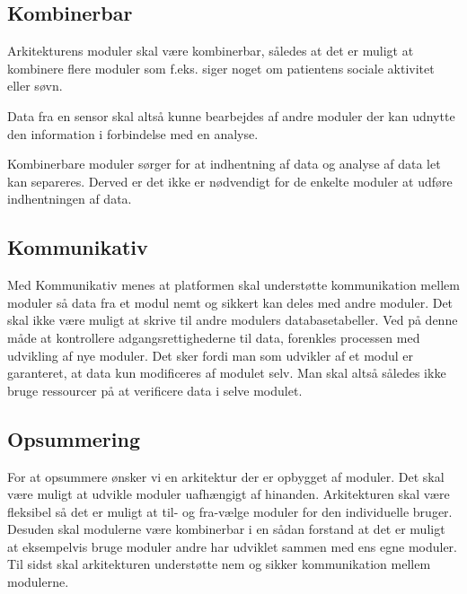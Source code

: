 \subsection{Kombinerbar}\label{arkitekturkrav::kombinerbar}
Arkitekturens moduler skal være kombinerbar, således at det er muligt at kombinere flere moduler som f.eks. siger noget om patientens sociale aktivitet eller søvn.

Data fra en sensor skal altså kunne bearbejdes af andre moduler der kan udnytte den information i forbindelse med en analyse.

Kombinerbare moduler sørger for at indhentning af data og analyse af data let kan separeres.
Derved er det ikke er nødvendigt for de enkelte moduler at udføre indhentningen af data.

\subsection{Kommunikativ}\label{arkitekturkrav::kommunikation}
Med Kommunikativ menes at platformen skal understøtte kommunikation mellem moduler så data fra et modul nemt og sikkert kan deles med andre moduler.
Det skal ikke være muligt at skrive til andre modulers databasetabeller.
Ved på denne måde at kontrollere adgangsrettighederne til data, forenkles processen med udvikling af nye moduler.
Det sker fordi man som udvikler af et modul er garanteret, at data kun modificeres af modulet selv.
Man skal altså således ikke bruge ressourcer på at verificere data i selve modulet.

\subsection{Opsummering}
For at opsummere ønsker vi en arkitektur der er opbygget af moduler.
Det skal være muligt at udvikle moduler uafhængigt af hinanden.
Arkitekturen skal være fleksibel så det er muligt at til- og fra-vælge moduler for den individuelle bruger.
Desuden skal modulerne være kombinerbar i en sådan forstand at det er muligt at eksempelvis bruge moduler andre har udviklet sammen med ens egne moduler.
Til sidst skal arkitekturen understøtte nem og sikker kommunikation mellem modulerne.

